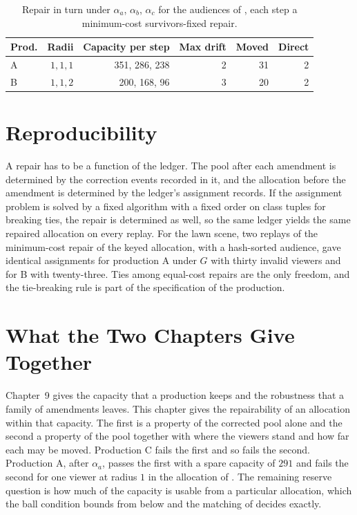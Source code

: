 \documentclass[11pt,twoside,openright]{book}
\theoremstyle{plain}
\theoremstyle{definition}
\theoremstyle{remark}
\begin{document}
\begin{table}[ht]
\centering
\begin{tabular}{@{}lrrrrr@{}}
\toprule
Prod. & Radii & Capacity per step & Max drift & Moved & Direct\\
\midrule
A & $1,1,1$ & 351, 286, 238 & 2 & 31 & 2\\
B & $1,1,2$ & 200, 168, 96 & 3 & 20 & 2\\
\bottomrule
\end{tabular}
\caption{Repair in turn under $\alpha_a$, $\alpha_b$, $\alpha_c$ for the audiences of , each step a minimum-cost survivors-fixed repair.}\label{tab:drift}
\end{table}

\section{Reproducibility}\label{sec:reproduce}

A repair has to be a function of the ledger. The pool after each amendment is determined by the correction events recorded in it, and the allocation before the amendment is determined by the ledger's assignment records. If the assignment problem is solved by a fixed algorithm with a fixed order on class tuples for breaking ties, the repair is determined as well, so the same ledger yields the same repaired allocation on every replay. For the lawn scene, two replays of the minimum-cost repair of the keyed allocation, with a hash-sorted audience, gave identical assignments for production A under $G$ with thirty invalid viewers and for B with twenty-three. Ties among equal-cost repairs are the only freedom, and the tie-breaking rule is part of the specification of the production.

\section{What the Two Chapters Give Together}\label{sec:together}

Chapter~9 gives the capacity that a production keeps and the robustness that a family of amendments leaves. This chapter gives the repairability of an allocation within that capacity. The first is a property of the corrected pool alone and the second a property of the pool together with where the viewers stand and how far each may be moved. Production C fails the first and so fails the second. Production A, after $\alpha_a$, passes the first with a spare capacity of $291$ and fails the second for one viewer at radius $1$ in the allocation of . The remaining reserve question is how much of the capacity is usable from a particular allocation, which the ball condition bounds from below and the matching of  decides exactly.
\end{document}
